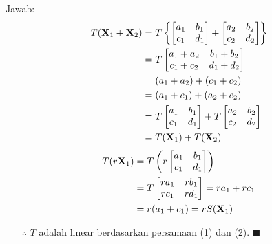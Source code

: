 \documentclass[12pt, a4paper]{scrartcl}
\begin{document}
\begin{enumerate}
\begin{enumerate}
            Jawab:
            \setcounter{equation}{0}
            \begin{align}
                T(\textbf{X}_1 + \textbf{X}_2) &=T\left\{\begin{bmatrix}
                    a_1&b_1\\c_1&d_1
                \end{bmatrix}+\begin{bmatrix}
                    a_2&b_2\\c_2&d_2
                \end{bmatrix}\right\}\notag\\ &=T\begin{bmatrix}
                    a_1+a_2&b_1+b_2\\c_1+c_2&d_1+d_2
                \end{bmatrix}\notag\\ &=(a_1+a_2)+(c_1+c_2)
                \notag\\ &= (a_1+c_1)+(a_2+c_2)
                \notag\\ &= T\begin{bmatrix}
                    a_1&b_1\\c_1&d_1
                \end{bmatrix}+T\begin{bmatrix}
                    a_2&b_2\\c_2&d_2
                \end{bmatrix} \notag\\ &= T(\textbf{X}_1)+T(\textbf{X}_2)
            \end{align}
            \begin{align}
                T(r\textbf{X}_1) &=T\left(r\begin{bmatrix}
                    a_1&b_1\\c_1&d_1
                \end{bmatrix}\right) \notag\\ &=T\begin{bmatrix}
                    ra_1&rb_1\\rc_1&rd_1
                \end{bmatrix} = ra_1+rc_1 \notag\\ &=r(a_1+c_1) =rS(\textbf{X}_1)
            \end{align}
            \begin{itemize}
                \item[$\therefore$] $T$ adalah linear berdasarkan persamaan (1) dan (2). $\blacksquare$
            \end{itemize}


\end{enumerate}
\end{enumerate}
\end{document}
